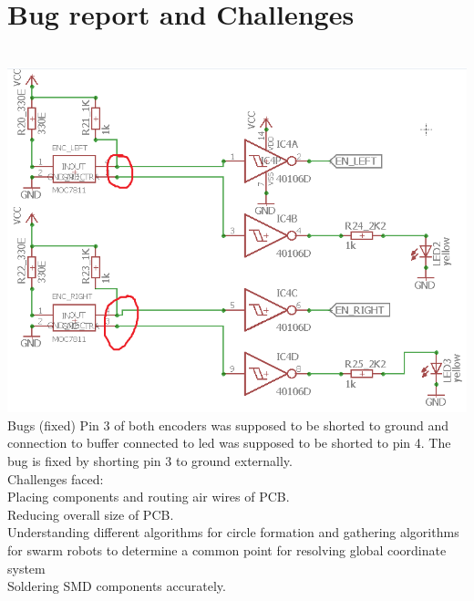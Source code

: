 \documentclass[a4paper,12pt,oneside]{book}
\begin{document}
\section{Bug report and Challenges}
\hfill\\
	\includegraphics[width=\textwidth]{./Capture2.png}
\hfill\\
Bugs (fixed)
Pin 3 of both encoders was supposed to be shorted to ground and connection to buffer connected to led was supposed to be shorted to pin 4. The bug is fixed by shorting pin 3 to ground externally.\\

Challenges faced:\\
Placing components and routing air wires of PCB.\\

Reducing overall size of PCB.\\

Understanding different algorithms for circle formation and gathering algorithms for swarm robots to determine a common point for resolving global coordinate system\\

Soldering SMD components accurately.\\
\end{document}
